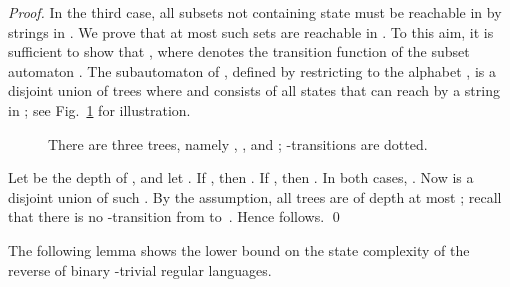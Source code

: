 \documentclass[runningheads]{llncs}
\newcommand{\R}{}
\begin{document}
\begin{proof}
    In the third case, all subsets not containing state   
    must be reachable in  
    by strings in . 
    We prove that at most  such sets are reachable in .
    To this aim, it is sufficient to show that ,
    where  denotes the transition function of the subset automaton .
    The subautomaton of , defined by restricting to the alphabet ,
    is a disjoint union of trees  where  and 
    consists of all states that can reach  by a string in ;
    see Fig.~\ref{fig:trees} for illustration.
    \begin{figure}[t]
      \centering
      \caption{There are three trees, namely , , and ; -transitions are dotted.}
      \label{fig:trees}
    \end{figure}
    Let  be the depth of , and let .
    If , then . 
    If , then .
    In both cases, .
    Now  is a disjoint union of such . 
    By the assumption, all trees are of depth at most ;
    recall that there is no -transition from  to~.
    Hence  follows.
  \qed
  \end{proof}

  The following lemma shows the lower bound 
  on the state complexity of the reverse of binary \R-trivial regular languages.
\end{document}
